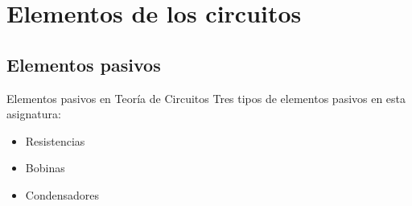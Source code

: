 \documentclass[aspectratio=169, xcolor={usenames,svgnames,dvipsnames}]{beamer}
\begin{document}

\section{Elementos de los circuitos}

\subsection{Elementos pasivos}

\begin{frame}{Elementos pasivos en Teoría de Circuitos}
    Tres tipos de elementos pasivos en esta asignatura:
    \vspace{2mm}
    \begin{itemize}
        \item Resistencias         
        \vspace{2mm}
        \item Bobinas 
        \vspace{2mm}
        \item Condensadores
    \end{itemize}
\end{frame}

\end{document}
